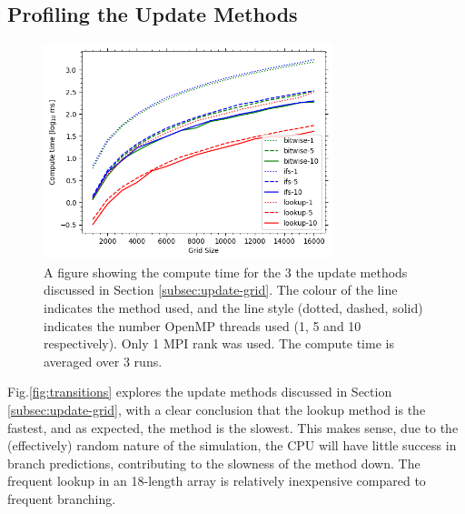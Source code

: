    \subsection{Profiling the Update Methods}\label{subsec:prof-trans}
    \begin{figure}[htb]
    \centering
    \includegraphics[width=0.75\textwidth]{./figures/transitions}
    \caption{A figure showing the compute time for the 3 the update methods discussed in Section \eqref{subsec:update-grid}.
        The colour of the line indicates the method used, and the line style (dotted, dashed, solid) indicates the number
        OpenMP threads used (1, 5 and 10 respectively).
        Only 1 MPI rank was used.
        The compute time is averaged over 3 runs.}
    \label{fig:transitions}
    \end{figure}

    Fig.\eqref{fig:transitions} explores the update methods discussed in Section \eqref{subsec:update-grid}, with a
    clear conclusion that the lookup method is the fastest, and as expected, the  method is the slowest.
    This makes sense, due to the (effectively) random nature of the simulation, the CPU will have little success
    in branch predictions, contributing to the slowness of the  method down.
    The frequent lookup in an 18-length array is relatively inexpensive compared to frequent branching.

